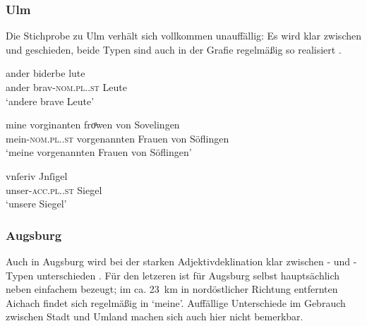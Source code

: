 \subsubsection{Ulm}
\label{par:adjulm}
Die Stichprobe zu Ulm verhält sich vollkommen unauffällig: Es wird klar
zwischen  und  geschieden, beide Typen sind auch in der
Grafie regelmäßig so realisiert .

\begin{exe}
\ex \label{ex:adjulm}
	\begin{xlist}
	\ex \label{ex:adjulm_1}
		\gll ander biderbe lute \\
			ander brav-\textsc{nom.pl.\MascX.st} Leute \\
		\trans `andere brave Leute'
			\parencites(Nr.~3308, Ulm, 1299)[455,44]{cao4}

	\ex \label{ex:adjulm_2}
		\gll mine vorginanten froͤwen von Sovelingen \\
			mein-\textsc{nom.pl.\FemF.st} vorgenannten Frauen von Söflingen \\
		\trans `meine vorgenannten Frauen von Söflingen'
			\parencites(Nr.~2467, Ulm, 1296)[526,36]{cao3}

	\ex \label{ex:adjulm_3}
		\gll vnſeriv Jnſigel \\
			unser-\textsc{acc.pl.\NeutI.st} Siegel \\
		\trans `unsere Siegel'
			\parencites(Nr.~1662, Ulm, 1293)[3,12--13]{cao3}
	\end{xlist}
\end{exe}

\subsubsection{Augsburg}
\label{par:adjaugsburg}
Auch in Augsburg wird bei der starken Adjektivdeklination klar zwischen
- und -Typen unterschieden . Für den letzeren
ist für Augsburg selbst hauptsächlich  neben einfachem 
bezeugt; im ca. 23~km in nordöstlicher Richtung entfernten Aichach findet sich
regelmäßig  in  `meine'. Auffällige Unterschiede im
Gebrauch zwischen Stadt und Umland machen sich auch hier nicht bemerkbar.

